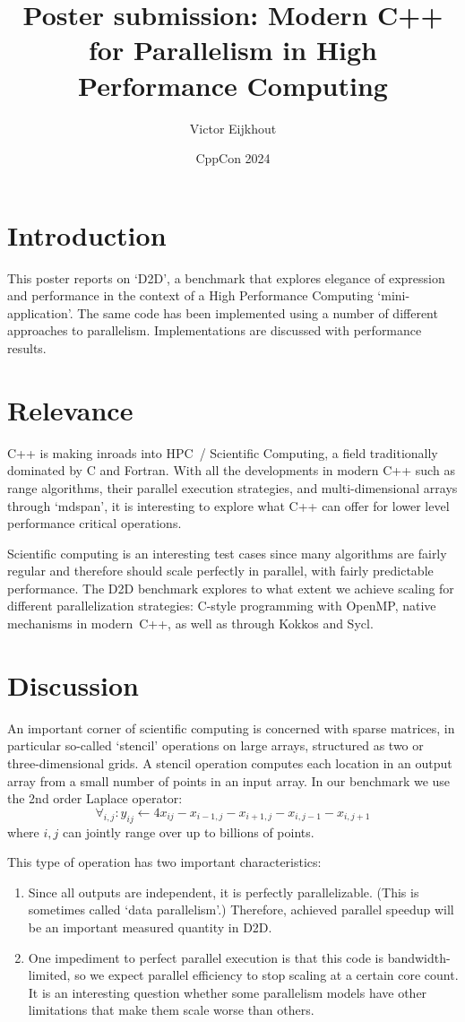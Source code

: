 \documentclass[11pt,fleqn]{artikel3}
\title{Poster submission: Modern C++ for Parallelism in High Performance Computing}
\author{Victor Eijkhout}
\date{CppCon 2024}
\begin{document}
\maketitle

\section*{Introduction}

This poster reports on `D2D', a benchmark that explores elegance of expression
and performance in the context of a High Performance Computing `mini-application'.
The same code has been implemented using a number of different
approaches to parallelism.
Implementations are discussed with performance results.

\section*{Relevance}

C++ is making inroads into HPC~/ Scientific Computing,
a field traditionally dominated by C and Fortran.
With all the developments in modern C++ such as
range algorithms, their parallel execution strategies,
and multi-dimensional arrays through `mdspan',
it is interesting to explore what C++ can offer
for lower level performance critical operations.

Scientific computing is an interesting test cases since many algorithms
are fairly regular and therefore should scale perfectly in parallel,
with fairly predictable performance.
The D2D benchmark explores to what extent
we achieve scaling for
different parallelization strategies:
C-style programming with OpenMP, native mechanisms in modern~C++,
as well as through Kokkos and Sycl.

\section*{Discussion}

An important corner of scientific computing is concerned with
sparse matrices, in particular so-called `stencil' operations
on large arrays, structured as two or three-dimensional grids.
A stencil operation computes each location in an output array
from a small number of points in an input array.
In our benchmark we use the 2nd order Laplace operator:
\[ \forall_{i,j}\colon y_{ij} \leftarrow 4x_{ij}-x_{i-1,j}-x_{i+1,j}-x_{i,j-1}-x_{i,j+1} \]
where $i,j$ can jointly range over up to billions of points.

This type of operation has two important characteristics:
\begin{enumerate}
\item Since all outputs are independent, it is perfectly parallelizable.
  (This is sometimes called `data parallelism'.)
  Therefore, achieved parallel speedup will be an important measured quantity in D2D.
\item One impediment to perfect parallel execution is that this code is bandwidth-limited,
  so we expect parallel efficiency to stop scaling at a certain core count.
  It is an interesting question whether some parallelism models have other limitations
  that make them scale worse than others.
\end{enumerate}
\end{document}
